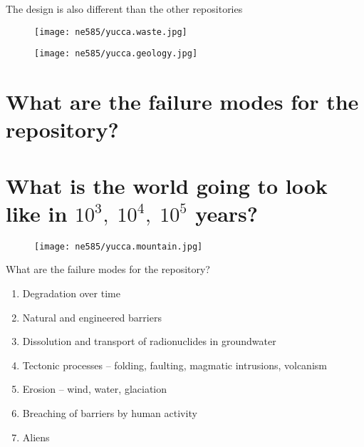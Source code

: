 \documentclass[aspectratio=1610,pdftex,dvipsnames,compress,xcolor={dvipsnames}]{beamer}
\begin{document}
\begin{frame}{The design is also different than the other repositories}
    \begin{figure}
        \centering
        \texttt{[image: ne585/yucca.waste.jpg]}
    \end{figure}
\end{frame}


\begin{frame}{}
    \begin{figure}
        \centering
        \texttt{[image: ne585/yucca.geology.jpg]}
    \end{figure}
\end{frame}


\section{What are the failure modes for the repository?}
\section{What is the world going to look like in $10^3, \; 10^4, \; 10^5$ years?}


\addtocounter{framenumber}{-2} 
\begin{frame}{}
    \begin{figure}
        \centering
        \texttt{[image: ne585/yucca.mountain.jpg]}
    \end{figure}
\end{frame}


\begin{frame}{What are the failure modes for the repository?}
    \begin{enumerate}[series=outerlist,topsep=0pt,itemsep=21pt,leftmargin=*,label=(\arabic*)]
        \item[]Degradation over time
        \item[]Natural and engineered barriers
        \item[]Dissolution and transport of radionuclides in groundwater
        \item[]Tectonic processes -- folding, faulting, magmatic intrusions, volcanism
        \item[]Erosion -- wind, water, glaciation
        \item[]Breaching of barriers by human activity
        \item[]Aliens
    \end{enumerate}
\end{frame}
\end{document}
